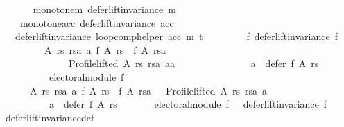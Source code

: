 \begin{isabellebody}
\ \ \isanewline
\ \ \ \ monotone{\isacharunderscore}{\kern0pt}m{\isacharcolon}{\kern0pt}\ {\isachardoublequoteopen}defer{\isacharunderscore}{\kern0pt}lift{\isacharunderscore}{\kern0pt}invariance\ m{\isachardoublequoteclose}\ \isanewline
\ \ \ \ monotone{\isacharunderscore}{\kern0pt}acc{\isacharcolon}{\kern0pt}\ {\isachardoublequoteopen}defer{\isacharunderscore}{\kern0pt}lift{\isacharunderscore}{\kern0pt}invariance\ acc{\isachardoublequoteclose}\isanewline
\ \ \ {\isachardoublequoteopen}defer{\isacharunderscore}{\kern0pt}lift{\isacharunderscore}{\kern0pt}invariance\ {\isacharparenleft}{\kern0pt}loop{\isacharunderscore}{\kern0pt}comp{\isacharunderscore}{\kern0pt}helper\ acc\ m\ t{\isacharparenright}{\kern0pt}{\isachardoublequoteclose}\isanewline
%
\isadelimproof
%
\endisadelimproof
%
\isatagproof
{}\isamarkupfalse%
\ {\isacharminus}{\kern0pt}\isanewline
\ \ \isamarkupfalse%
\isanewline
\ \ \ \ {\isachardoublequoteopen}{\isasymforall}f{\isachardot}{\kern0pt}\ {\isacharparenleft}{\kern0pt}defer{\isacharunderscore}{\kern0pt}lift{\isacharunderscore}{\kern0pt}invariance\ f\ {\isasymor}\isanewline
\ \ \ \ \ \ \ \ \ {\isacharparenleft}{\kern0pt}{\isasymexists}A\ rs\ rsa\ a{\isachardot}{\kern0pt}\ f\ A\ rs\ {\isasymnoteq}\ f\ A\ rsa\ {\isasymand}\isanewline
\ \ \ \ \ \ \ \ \ \ \ \ \ \ Profile{\isachardot}{\kern0pt}lifted\ A\ rs\ rsa\ {\isacharparenleft}{\kern0pt}a{\isacharcolon}{\kern0pt}{\isacharcolon}{\kern0pt}{\isacharprime}{\kern0pt}a{\isacharparenright}{\kern0pt}\ {\isasymand}\isanewline
\ \ \ \ \ \ \ \ \ \ \ \ \ \ a\ {\isasymin}\ defer\ f\ A\ rs{\isacharparenright}{\kern0pt}\ {\isasymor}\isanewline
\ \ \ \ \ \ \ \ \ {\isasymnot}\ electoral{\isacharunderscore}{\kern0pt}module\ f{\isacharparenright}{\kern0pt}\ {\isasymand}\isanewline
\ \ \ \ \ \ {\isacharparenleft}{\kern0pt}{\isacharparenleft}{\kern0pt}{\isasymforall}A\ rs\ rsa\ a{\isachardot}{\kern0pt}\ f\ A\ rs\ {\isacharequal}{\kern0pt}\ f\ A\ rsa\ {\isasymor}\ {\isasymnot}\ Profile{\isachardot}{\kern0pt}lifted\ A\ rs\ rsa\ a\ {\isasymor}\isanewline
\ \ \ \ \ \ \ \ \ \ a\ {\isasymnotin}\ defer\ f\ A\ rs{\isacharparenright}{\kern0pt}\ {\isasymand}\isanewline
\ \ \ \ \ \ electoral{\isacharunderscore}{\kern0pt}module\ f\ {\isasymor}\ {\isasymnot}\ defer{\isacharunderscore}{\kern0pt}lift{\isacharunderscore}{\kern0pt}invariance\ f{\isacharparenright}{\kern0pt}{\isachardoublequoteclose}\isanewline
\ \ \ \ \isamarkupfalse%
\ defer{\isacharunderscore}{\kern0pt}lift{\isacharunderscore}{\kern0pt}invariance{\isacharunderscore}{\kern0pt}def\isanewline

\end{isabellebody}
